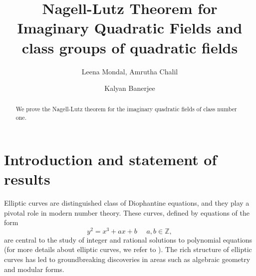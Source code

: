 \documentclass[12pt,leqno]{amsart}
\newcommand{\<}{\langle}
\renewcommand{\>}{\rangle}
\theoremstyle{definition}
\numberwithin{equation}{section}
\begin{document}
\title[]
{Nagell-Lutz Theorem for Imaginary Quadratic Fields and class groups of quadratic fields}
\author{Leena Mondal, Amrutha Chalil \and Kalyan Banerjee}
\address[Leena Mondal]{SRM University AP, 
Department of Mathematics, Neerukonda, Amaravati, Andhra Pradesh-522240, India}
\address[Amrutha Chalil]{SRM University AP,
Department of Mathematics, Neerukonda, Amaravati, Andhra Pradesh-522240, India}
\address[Kalyan Banerjee]{SRM University AP,
Department of Mathematics, Neerukonda, Amaravati, Andhra Pradesh-522240, India}







\date{}
 
\maketitle


\begin{abstract}

We prove the Nagell-Lutz theorem for the imaginary quadratic fields of class number one.
 
\end{abstract}

\section{Introduction and statement of results}

Elliptic curves are distinguished class of Diophantine equations, and they play a pivotal role in modern number theory. These curves, defined by equations of the form 
\begin{equation}\label{gnrl eqn}
y^2=x^3+ax+b~~~~~~a,b\in \mathbb Z,
\end{equation} 
are central to the study of integer and rational solutions to polynomial equations (for more details about elliptic curves, we refer to \cite{S-T}). The rich structure of elliptic curves has led to groundbreaking discoveries in areas such as algebraic geometry and modular forms. 

\smallskip
\end{document}

